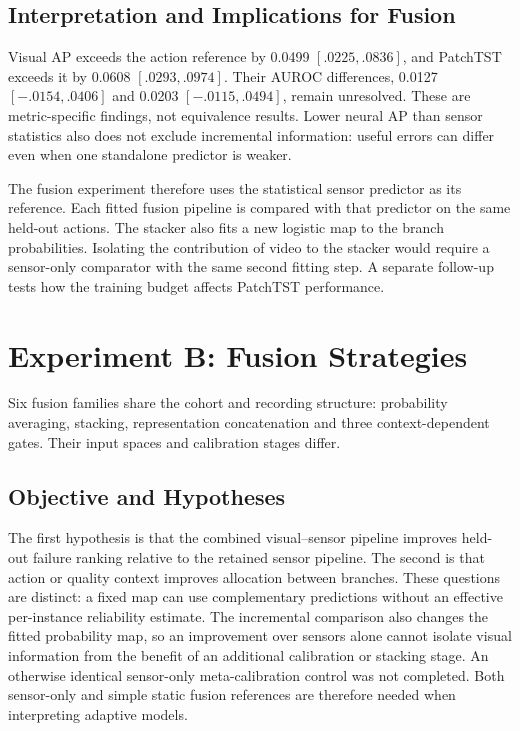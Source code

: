 \subsection{Interpretation and Implications for Fusion}
Visual AP exceeds the action reference by 0.0499 $[.0225,.0836]$, and PatchTST exceeds it by 0.0608 $[.0293,.0974]$. Their AUROC differences, 0.0127 $[-.0154,.0406]$ and 0.0203 $[-.0115,.0494]$, remain unresolved. These are metric-specific findings, not equivalence results. Lower neural AP than sensor statistics also does not exclude incremental information: useful errors can differ even when one standalone predictor is weaker.

The fusion experiment therefore uses the statistical sensor predictor as its reference. Each fitted fusion pipeline is compared with that predictor on the same held-out actions. The stacker also fits a new logistic map to the branch probabilities. Isolating the contribution of video to the stacker would require a sensor-only comparator with the same second fitting step. A separate follow-up tests how the training budget affects PatchTST performance.

\section{Experiment B: Fusion Strategies}
Six fusion families share the cohort and recording structure: probability averaging, stacking, representation concatenation and three context-dependent gates. Their input spaces and calibration stages differ.

\subsection{Objective and Hypotheses}
The first hypothesis is that the combined visual--sensor pipeline improves held-out failure ranking relative to the retained sensor pipeline. The second is that action or quality context improves allocation between branches. These questions are distinct: a fixed map can use complementary predictions without an effective per-instance reliability estimate. The incremental comparison also changes the fitted probability map, so an improvement over sensors alone cannot isolate visual information from the benefit of an additional calibration or stacking stage. An otherwise identical sensor-only meta-calibration control was not completed. Both sensor-only and simple static fusion references are therefore needed when interpreting adaptive models.

